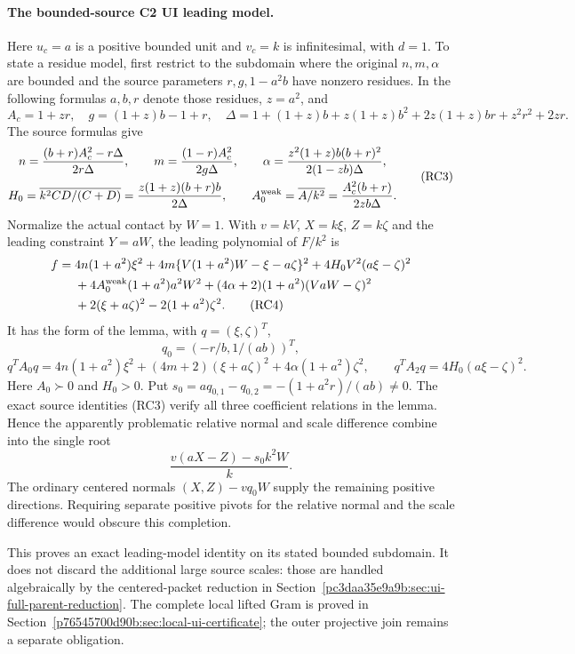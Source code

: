 \paragraph{The bounded-source C2 UI leading model.}
Here $u_c=a$ is a positive bounded unit and $v_c=k$ is
infinitesimal, with $d=1$. To state a residue model, first restrict
to the subdomain where the original $n,m,\alpha$ are bounded and
the source parameters $r,g,1-a^2b$ have nonzero residues. In the
following formulas $a,b,r$ denote those residues, $z=a^2$, and
\[
 A_c=1+zr,\quad g=(1+z)b-1+r,\quad
 \Delta=1+(1+z)b+z(1+z)b^2+2z(1+z)br+z^2r^2+2zr.
\]
The source formulas give
\[
\begin{gathered}
 n=\frac{(b+r)A_c^2-r\Delta}{2r\Delta},\qquad
 m=\frac{(1-r)A_c^2}{2g\Delta},\qquad
 \alpha=\frac{z^2(1+z)b(b+r)^2}{2(1-zb)\Delta},\\
 H_0=\overline{k^2CD/(C+D)}
       =\frac{z(1+z)(b+r)b}{2\Delta},\qquad
 A_0^{\rm weak}=\overline{A/k^2}
       =\frac{A_c^2(b+r)}{2zb\Delta}.
\end{gathered}                                                   \tag{RC3}
\]
Normalize the actual contact by $W=1$. With $v=kV$, $X=k\xi$,
$Z=k\zeta$ and the leading constraint $Y=aW$, the leading
polynomial of $F/k^2$ is
\begin{align*}
 f={}&4n(1+a^2)\xi^2
 +4m\{V(1+a^2)W-\xi-a\zeta\}^2
 +4H_0V^2(a\xi-\zeta)^2\\
 &+4A_0^{\rm weak}(1+a^2)a^2W^2
 +(4\alpha+2)(1+a^2)(VaW-\zeta)^2\\
 &+2(\xi+a\zeta)^2-2(1+a^2)\zeta^2.               \tag{RC4}
\end{align*}
It has the form of the lemma, with $q=(\xi,\zeta)^T$,
\[
 q_0=(-r/b,1/(ab))^T,
\]
\[
 q^TA_0q=4n(1+a^2)\xi^2+(4m+2)(\xi+a\zeta)^2
                      +4\alpha(1+a^2)\zeta^2,
 \qquad q^TA_2q=4H_0(a\xi-\zeta)^2.
\]
Here $A_0\succ0$ and $H_0>0$. Put
$s_0=aq_{0,1}-q_{0,2}=-(1+a^2r)/(ab)\ne0$.
The exact source identities (RC3) verify all three coefficient
relations in the lemma. Hence the apparently problematic relative
normal and scale difference combine into the single root
\[
             \frac{v(aX-Z)-s_0k^2W}{k}.             \tag{RC5}
\]
The ordinary centered normals $(X,Z)-vq_0W$ supply the remaining
positive directions. Requiring separate positive pivots for the
relative normal and the scale difference would obscure this
completion.

This proves an exact leading-model identity on its stated bounded
subdomain. It does not discard the additional large source scales:
those are handled algebraically by the centered-packet reduction in
Section~\ref{pc3daa35e9a9b:sec:ui-full-parent-reduction}. The complete local lifted
Gram is proved in Section~\ref{p76545700d90b:sec:local-ui-certificate}; the outer
projective join remains a separate obligation.
